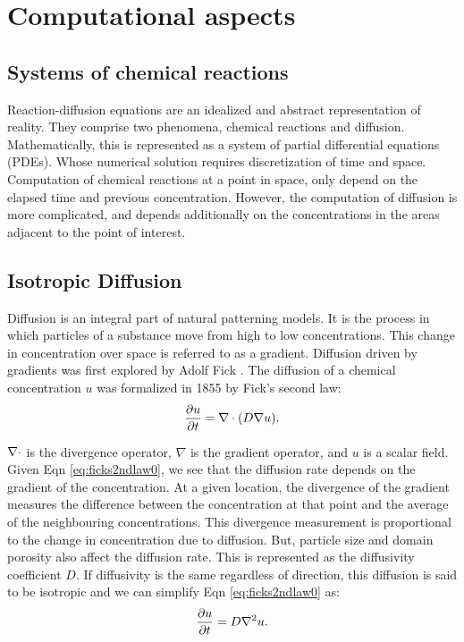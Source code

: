 \newcommand{\Morph}{u}

\chapter{Computational aspects}

\section{Systems of chemical reactions}
Reaction-diffusion equations are an idealized and abstract representation of reality. They comprise two phenomena, chemical reactions and diffusion. Mathematically, this is represented as a system of partial differential equations (PDEs). Whose numerical solution requires discretization of time and space. Computation of chemical reactions at a point in space, only depend on the elapsed time and previous concentration. However, the computation of diffusion is more complicated, and depends additionally on the concentrations in the areas adjacent to the point of interest.

\section{Isotropic Diffusion}
Diffusion is an integral part of natural patterning models. It is the process in which particles of a substance move from high to low concentrations. This change in concentration over space is referred to as a gradient. Diffusion driven by gradients was first explored by Adolf Fick \cite{fick1995liquid}. The diffusion of a chemical concentration $\Morph$ was formalized in 1855 by Fick's second law:
\begin{equation}
\label{eq:ficks2ndlaw0}
	\frac{\partial \Morph}{\partial t} = \Div (D \nabla \Morph).
\end{equation}
	
$\nabla \cdot$ is the divergence operator, $\nabla$ is the gradient operator, and $u$ is a scalar field. Given Eqn \ref{eq:ficks2ndlaw0}, we see that the diffusion rate depends on the gradient of the concentration. At a given location, the divergence of the gradient measures the difference between the concentration at that point and the average of the neighbouring concentrations. This divergence measurement is proportional to the change in concentration due to diffusion. But, particle size and domain porosity also affect the diffusion rate. This is represented as the diffusivity coefficient $D$. If diffusivity is the same regardless of direction, this diffusion is said to be isotropic and we can simplify Eqn \ref{eq:ficks2ndlaw0} as:
\begin{equation}
\label{eq:ficks2ndlaw1}
	\frac{\partial \Morph}{\partial t} = D \Lap \Morph.
\end{equation}
	

